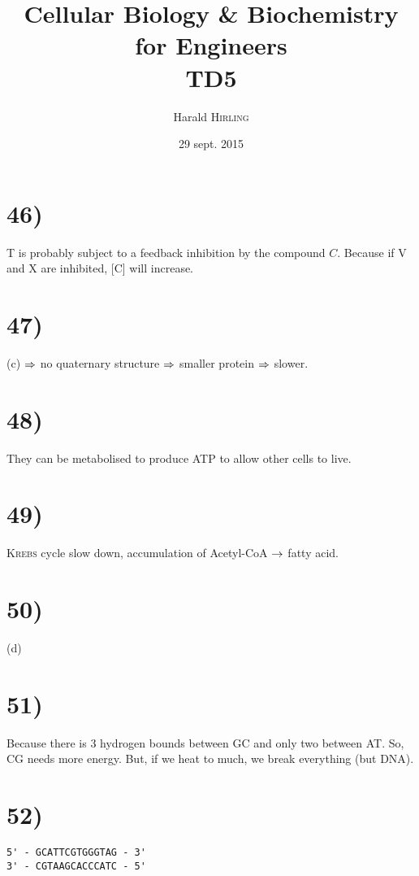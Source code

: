 

\title{Cellular Biology \& Biochemistry for Engineers\\TD5}
\author{Harald \textsc{Hirling}}
\date{29 sept. 2015}


\maketitle

\section*{46)}

T is probably subject to a feedback inhibition by the compound $C$. Because if V and X are inhibited, [C] will increase.

\section*{47)}
(c) $\Rightarrow$ no quaternary structure $\Rightarrow$ smaller protein $\Rightarrow$ slower.

\section*{48)}
They can be metabolised to produce ATP to allow other cells to live.

\section*{49)}
\textsc{Krebs} cycle slow down, accumulation of Acetyl-CoA $\rightarrow$ fatty acid.

\section*{50)}
(d)

\section*{51)}
Because there is 3 hydrogen bounds between GC and only two between AT. So, CG needs more energy. But, if we heat to much, we break everything (but DNA).

\section*{52)}
\begin{verbatim}
5' - GCATTCGTGGGTAG - 3'
3' - CGTAAGCACCCATC - 5'
\end{verbatim}


